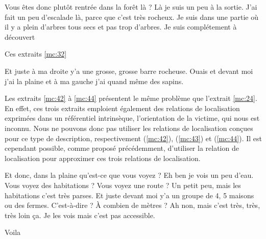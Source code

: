 \begin{dialogue*}
  \Sec {} Vous êtes donc plutôt rentrée dans la forêt là ?
  \Req {} Là je suis un peu à la
  sortie.  J’ai fait un peu d’escalade là,
   parce que c’est très rocheux.  Je
  suis dans une partie où il y a plein d’arbres tous secs et pas trop
  d’arbres. Je suis complétement à découvert
\end{dialogue*}
% 
Ces extraits \ref{mc:32}


\begin{dialogue*}
  \Req {} Et juste à ma droite y’a une grosse, grosse
  barre rocheuse.  Ouais et devant moi j’ai la plaine
  et  à ma gauche j’ai quand même des sapins.
\end{dialogue*}
% 
Les extraits \ref{mc:42} à \ref{mc:44} présentent le même problème que
l'extrait \ref{mc:24}. En effet, ces trois extraits emploient
également des relations de localisation exprimées dans un référentiel
intrinsèque, l'orientation de la victime, qui nous est inconnu. Nous
ne pouvons donc pas utiliser les relations de localisation conçues
pour ce type de description, respectivement
 (\ref{mc:42}),
 (\ref{mc:43}) et
 (\ref{mc:44}). Il est cependant
possible, comme proposé précédemment, d'utiliser la relation de
localisation  pour approximer ces trois
relations de localisation.



\begin{dialogue*}
  \Sec {} Et donc, dans la plaine qu’est-ce que vous
  voyez ?
  \Req {} Eh ben je vois un peu d’eau.
  \Sec {} Vous voyez des habitations ? Vous voyez une
  route ?
  \Req {} Un petit peu, mais les habitations c’est très
  parses.  Et juste devant moi y’a un groupe de 4, 5
  maisons ou des fermes.
  \Sec {} C’est-à-dire ? À combien de mètres ?
  \Req {} Ah non, mais c’est très, très, très loin
  ça. Je les vois mais c’est pas accessible.
\end{dialogue*}
% 
Voila


